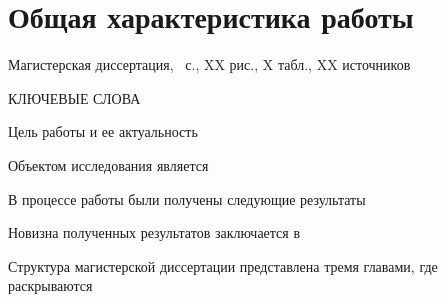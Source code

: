 \chapter*{Общая характеристика работы}

Магистерская диссертация, \pageref{lastpage}~с., XX рис., X табл., XX источников

\bigskip

\noindent КЛЮЧЕВЫЕ СЛОВА


\bigskip

Цель работы и ее актуальность


Объектом исследования является

В процессе работы были получены следующие результаты

Новизна полученных результатов заключается в


Структура магистерской диссертации представлена тремя главами, где
раскрываются



